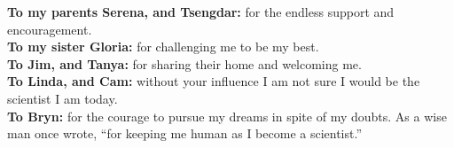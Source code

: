 %
\begin{frontmatter}

%
%
\makefrontmatter

%
%
%
%
%
%



\begin{mydedication} %
  \begin{flushleft}
  \vspace{1cm}
  \textbf{To my parents Serena, and Tsengdar:} for the endless support and encouragement.\\
  \textbf{To my sister Gloria:} for challenging me to be my best.\\[1cm]
  \textbf{To Jim, and Tanya:} for sharing their home and welcoming me.\\[1cm]
  \textbf{To Linda, and Cam:} without your influence I am not sure I would be the scientist I am today.\\[3cm]
  \textbf{To Bryn:} for the courage to pursue my dreams in spite of my doubts. As a wise man once wrote, ``for keeping me human as I become a scientist.''\\[3cm]
  \end{flushleft}
\end{mydedication}



%
%

%



\end{frontmatter}
